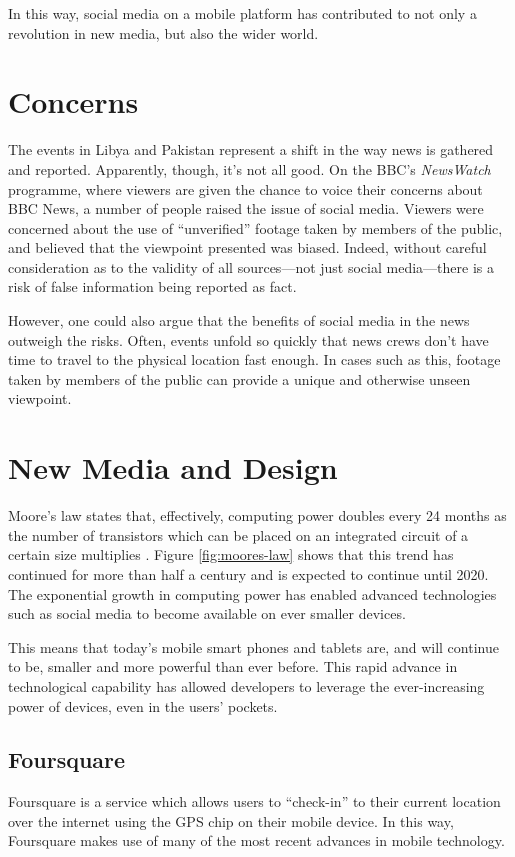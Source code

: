 \documentclass[a4paper,11pt]{article}
\begin{document}
    In this way, social media on a mobile platform has contributed to not only
    a revolution in new media, but also the wider world.

    \section{Concerns}

    The events in Libya and Pakistan represent a shift in the way news is
    gathered and reported.  Apparently, though, it's not all good. On the BBC's
    \emph{NewsWatch} programme, where viewers are given the chance to voice
    their concerns about BBC News, a number of people raised the issue of
    social media. Viewers were concerned about the use of ``unverified''
    footage taken by members of the public, and believed that the viewpoint
    presented was biased. Indeed, without careful consideration as to the
    validity of all sources---not just social media---there is a risk of false
    information being reported as fact.

    However, one could also argue that the benefits of social media in the news
    outweigh the risks. Often, events unfold so quickly that news crews don't
    have time to travel to the physical location fast enough. In cases such as
    this, footage taken by members of the public can provide a unique and
    otherwise unseen viewpoint.

    \section{New Media and Design}

    Moore's law states that, effectively, computing power doubles every 24
    months as the number of transistors which can be placed on an integrated
    circuit of a certain size multiplies \cite{schaller1997}. Figure
    \ref{fig:moores-law} shows that this trend has continued for more than half
    a century and is expected to continue until 2020. The exponential growth in
    computing power has enabled advanced technologies such as social media to
    become available on ever smaller devices.

    This means that today's mobile smart phones and tablets are, and will
    continue to be, smaller and more powerful than ever before. This rapid
    advance in technological capability has allowed developers to leverage the
    ever-increasing power of devices, even in the users' pockets.

    \subsection{Foursquare}

    Foursquare is a service which allows users to ``check-in'' to their current
    location over the internet using the GPS chip on their mobile device. In
    this way, Foursquare makes use of many of the most recent advances in
    mobile technology.

    
    
\end{document}
